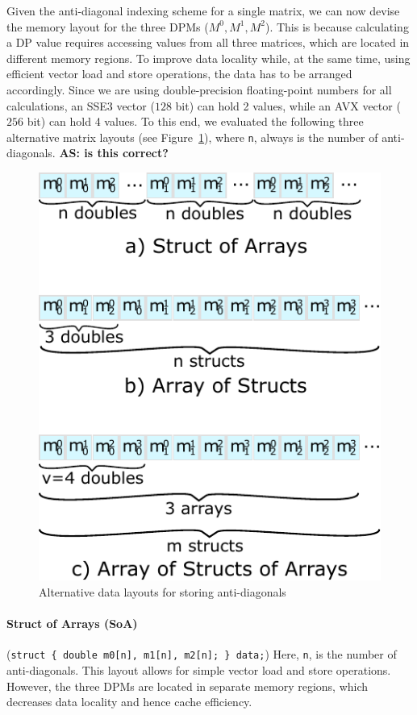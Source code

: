 \documentclass[runningheads,a4paper]{llncs}
\begin{document}
Given the anti-diagonal indexing scheme for a single matrix, we can now
devise the memory layout for the three DPMs ($M^0,M^1,M^2$).
This is because calculating a DP value requires
accessing values from all three matrices, which are located in different
memory regions.
To improve data locality while, at the same time, using efficient
vector load and store operations,
the data has to be arranged accordingly.  Since we are using
double-precision floating-point numbers for all calculations, an SSE3 vector
($128$ bit) can hold 2 values, while an AVX vector ($256$ bit) can hold 4 values.
To this end, we evaluated the following three alternative matrix layouts (see Figure~\ref{fig:datalayout}), 
where \verb|n|, always is the number of anti-diagonals. {\bf AS: is this correct?}

\begin{figure}[ht!]
  \centering
  \includegraphics[scale=0.7]{figures/datalayout.pdf}
  \caption{Alternative data layouts for storing anti-diagonals}
  \label{fig:datalayout}
\end{figure}


\paragraph*{Struct of Arrays (SoA)} ({\small\texttt{struct \{ double m0[n], m1[n], m2[n]; \} data;}})
Here, \verb|n|, is the number of anti-diagonals.
This layout allows for simple vector load and store operations.
However, the three DPMs are located in separate memory regions, which decreases
data locality and hence cache efficiency.
\end{document}
